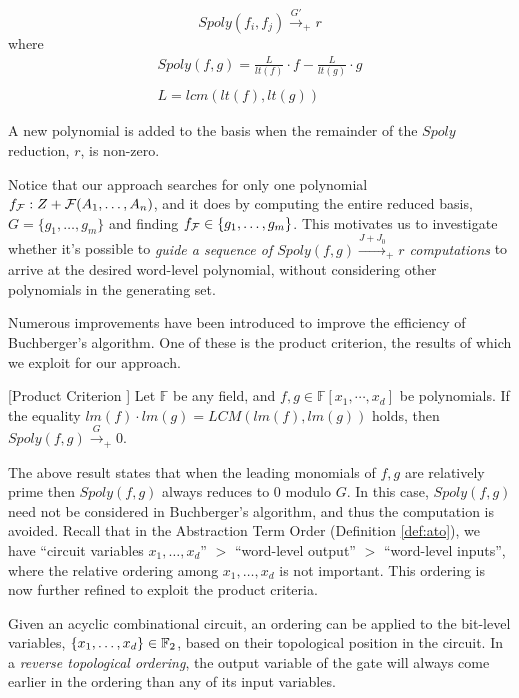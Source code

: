 \begin{equation}
Spoly(f_{i}, f_{j}) \stackrel{G'}{\textstyle\longrightarrow}_+r \nonumber
\end{equation}
where
\begin{eqnarray}
Spoly(f,g)=\frac{L}{lt(f)}\cdot f - \frac{L}{lt(g)}\cdot g \nonumber \\ 
\nonumber \\
L=lcm(lt(f),lt(g)) \nonumber
\end{eqnarray}

A new polynomial is added to the basis when the remainder of the $Spoly$
reduction, $r$, is non-zero.

Notice that our approach searches
for only one polynomial $f_{\mathcal{F}}:Z+{\mathcal{F}}(A_1,\dots,A_n)$, and it does
by computing the entire reduced \Grobner basis, $G=\{g_1,\dots,g_m\}$ and
finding $f_{\mathcal{F}}\in \{g_1,\dots,g_m\}$.
This motivates us to
investigate whether it's possible to {\it  guide a sequence of 
$Spoly(f,g)\xrightarrow{J+J_0}_+ r$  computations} to arrive at the desired
word-level polynomial, without considering other polynomials in the
generating set. 

Numerous improvements have been introduced to improve the efficiency of 
Buchberger's algorithm. One of these is the product criterion, the results
of which we exploit for our approach.

\begin{Lemma}
\label{lemma:prodcriteria}
[Product Criterion \cite{productc:1979}] Let $\mathbb{F}$ be any
field, and $f, g \in \mathbb{F}[x_1,\cdots,x_d]$ be polynomials. If
the equality $lm(f) \cdot lm(g) = LCM(lm(f), lm(g))$ holds, then
$Spoly(f,g)\stackrel{G}{\textstyle\longrightarrow}_+ 0.$ 
\end{Lemma}

The above result states that when the leading monomials of $f, g$ are
relatively prime then 
$Spoly(f, g)$ always reduces to 0 modulo $G$. In this case,
$Spoly(f, g)$ need not be considered in Buchberger's algorithm, and thus
the computation is avoided. 
Recall that in the Abstraction Term Order (Definition \ref{def:ato}),
we have ``circuit variables $x_1, \dots, x_d$'' $>$ ``word-level output''
$>$ ``word-level inputs'', where the
relative ordering among  $x_1, \dots, x_d$ is not important. This ordering
is now further refined to exploit the product criteria.

Given an acyclic combinational circuit, an ordering can be applied to the 
bit-level variables, $\{x_1,\dots,x_d\} \in {\mathbb{F}}_2$, 
based on their topological position in the circuit. In a {\it reverse topological
ordering}, the output variable of the gate will always come earlier in the
ordering than any of its input variables.

